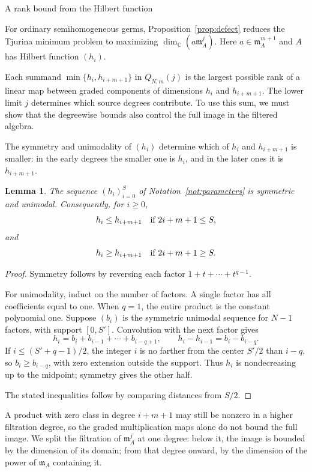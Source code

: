 \documentclass[12pt,reqno]{amsart}
\makeatletter
\renewcommand\subsection{\@startsection{subsection}{2}%
  \z@{.8\linespacing\@plus.3\linespacing}{.35\linespacing}%
  {\normalfont\bfseries}}
\newcommand{\C}{\mathbb C}
\newcommand{\mm}{\mathfrak m}
\newtheorem{lemma}[theorem]{Lemma}
\theoremstyle{definition}
\makeatother
\begin{document}
\subsection{A rank bound from the Hilbert function}

For ordinary semihomogeneous germs, Proposition~\ref{prop:defect}
reduces the Tjurina minimum problem to maximizing
$\dim_\C(a\mm_A^j)$. Here $a\in\mm_A^{m+1}$ and $A$ has Hilbert
function $(h_i)$.

Each summand $\min\{h_i,h_{i+m+1}\}$ in $Q_{N,m}(j)$ is the
largest possible rank of a linear map between graded components of
dimensions $h_i$ and $h_{i+m+1}$. The lower limit $j$ determines which
source degrees contribute. To use this sum, we must show that the
degreewise bounds also control the full image in the filtered
algebra.


The symmetry and unimodality of $(h_i)$ determine which of $h_i$
and $h_{i+m+1}$ is smaller: in the early degrees the smaller one is
$h_i$, and in the later ones it is $h_{i+m+1}$.


\begin{lemma}\label{lem:unimodal}
The sequence $(h_i)_{i=0}^S$ of Notation~\ref{not:parameters} is symmetric
and unimodal. Consequently, for $i\geq0$,
\[
 h_i\leq h_{i+m+1}\quad\hbox{if }2i+m+1\leq S,
\]
and
\[
 h_i\geq h_{i+m+1}\quad\hbox{if }2i+m+1\geq S.
\]

\end{lemma}
\begin{proof}
Symmetry follows by reversing each factor
$1+t+\cdots+t^{q-1}$.

For unimodality, induct on the number of factors. A single factor
has all coefficients equal to one. When $q=1$, the entire product
is the constant polynomial one. Suppose $(b_i)$ is the
symmetric unimodal sequence for $N-1$ factors, with support
$[0,S']$. Convolution with the next factor gives
\[
 h_i=b_i+b_{i-1}+\cdots+b_{i-q+1},\qquad
 h_i-h_{i-1}=b_i-b_{i-q}.
\]
If $i\leq(S'+q-1)/2$, the integer $i$ is no farther from the
center $S'/2$ than $i-q$, so $b_i\geq b_{i-q}$, with zero
extension outside the support. Thus $h_i$ is nondecreasing up
to the midpoint; symmetry gives the other half.

The stated inequalities follow by comparing distances from $S/2$.
\end{proof}

A product with zero class in degree $i+m+1$ may still be nonzero
in a higher filtration degree, so the graded multiplication maps
alone do not bound the full image. We split the filtration of
$\mm_A^j$ at one degree: below it, the image is bounded by the
dimension of its domain; from that degree onward, by the dimension
of the power of $\mm_A$ containing it.
\end{document}
